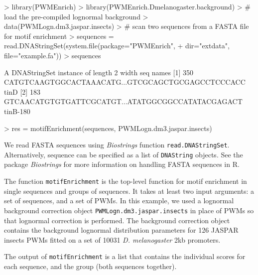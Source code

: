 \documentclass{article}
\newcommand{\Rfun}[1]{{\texttt{#1}}}
\newcommand{\Robj}[1]{{\texttt{#1}}}
\newcommand{\Rpackage}[1]{{\textit{#1}}}
\begin{document}
\begin{Schunk}
\begin{Sinput}
> library(PWMEnrich)
> library(PWMEnrich.Dmelanogaster.background)
> # load the pre-compiled lognormal background
> data(PWMLogn.dm3.jaspar.insects)
> # scan two sequences from a FASTA file for motif enrichment
> sequences = read.DNAStringSet(system.file(package="PWMEnrich", 
+   dir="extdata", file="example.fa"))
> sequences  
\end{Sinput}
\begin{Soutput}
  A DNAStringSet instance of length 2
    width seq                                               names               
[1]   350 CATGTCAAGTGGCACTAAACATG...GTCGCAGCTGCGAGCCTCCCACC tinD
[2]   183 GTCAACATGTGTGATTCGCATGT...ATATGGCGGCCATATACGAGACT tinB-180
\end{Soutput}
\begin{Sinput}
> res = motifEnrichment(sequences, PWMLogn.dm3.jaspar.insects)
\end{Sinput}
\end{Schunk}

We read FASTA sequences using \Rpackage{Biostrings} function \Robj{read.DNAStringSet}. Alternatively, sequence can be specified as a list of \Robj{DNAString} objects. See the package \Rpackage{Biostrings} for more information on handling FASTA sequences in R. 

The function \Rfun{motifEnrichment} is the top-level function for motif enrichment in single sequences and groups of sequences. It takes at least two input arguments: a set of sequences, and a set of PWMs. In this example, we used a lognormal background correction object \Robj{PWMLogn.dm3.jaspar.insects} in place of PWMs so that lognormal correction is performed. The background correction object contains the background lognormal distribution parameters for 126 JASPAR insects PWMs fitted on a set of 10031 \textit{D. melanogaster} 2kb promoters. 

The output of \Rfun{motifEnrichment} is a list that contains the individual scores for each sequence, and the group (both sequences together). 
\end{document}

